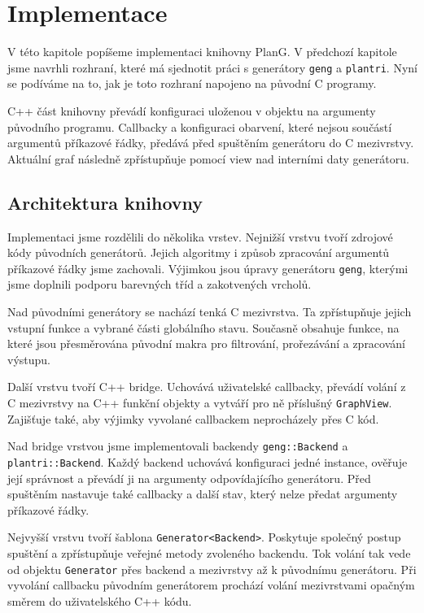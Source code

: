 \chapter{Implementace}
\label{chap:implementation}

V této kapitole popíšeme implementaci knihovny PlanG. V předchozí kapitole jsme
navrhli rozhraní, které má sjednotit práci s generátory \texttt{geng} a
\texttt{plantri}. Nyní se podíváme na to, jak je toto rozhraní napojeno na původní
C programy.

C++ část knihovny převádí konfiguraci uloženou v objektu na argumenty původního
programu. Callbacky a konfiguraci obarvení, které nejsou součástí argumentů
příkazové řádky, předává před spuštěním generátoru do C mezivrstvy. Aktuální
graf následně zpřístupňuje pomocí view nad interními daty generátoru.

\section{Architektura knihovny}
\label{sec:implementation-architecture}

Implementaci jsme rozdělili do několika vrstev. Nejnižší vrstvu tvoří zdrojové
kódy původních generátorů. Jejich algoritmy i způsob zpracování argumentů
příkazové řádky jsme zachovali. Výjimkou jsou úpravy generátoru \texttt{geng},
kterými jsme doplnili podporu barevných tříd a zakotvených vrcholů.

Nad původními generátory se nachází tenká C mezivrstva. Ta zpřístupňuje jejich
vstupní funkce a vybrané části globálního stavu. Současně obsahuje funkce,
na které jsou přesměrována původní makra pro filtrování, prořezávání a
zpracování výstupu.

Další vrstvu tvoří C++ bridge. Uchovává uživatelské callbacky, převádí volání
z C mezivrstvy na C++ funkční objekty a vytváří pro ně příslušný
\texttt{GraphView}. Zajišťuje také, aby výjimky vyvolané callbackem
neprocházely přes C kód.

Nad bridge vrstvou jsme implementovali backendy \texttt{geng::Backend} a
\texttt{plantri::Backend}. Každý backend uchovává konfiguraci jedné instance,
ověřuje její správnost a převádí ji na argumenty odpovídajícího generátoru.
Před spuštěním nastavuje také callbacky a další stav, který nelze předat
argumenty příkazové řádky.

Nejvyšší vrstvu tvoří šablona
\texttt{Generator\textless Backend\textgreater}. Poskytuje společný postup
spuštění a zpřístupňuje veřejné metody zvoleného backendu. Tok volání tak vede
od objektu \texttt{Generator} přes backend a mezivrstvy až k původnímu
generátoru. Při vyvolání callbacku původním generátorem prochází volání
mezivrstvami opačným směrem do uživatelského C++ kódu.


